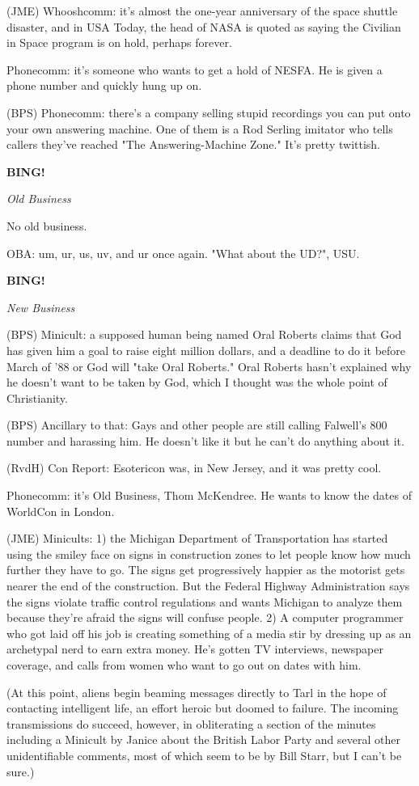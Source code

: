 \documentclass[12pt]{article}
\newcommand{\bing}{{\bf BING!} }
\newcommand{\goto}[1]{\bing \vskip 12pt \centerline{{\em{#1}}}}
\begin{document}
(JME) Whooshcomm: it's almost the one-year anniversary of the space shuttle disaster, and in USA Today, the head of NASA is quoted as saying the Civilian in Space program is on hold, perhaps forever.

Phonecomm: it's someone who wants to get a hold of NESFA. He is given a phone number and quickly hung up on.

(BPS) Phonecomm: there's a company selling stupid recordings you can put onto your own answering machine. One of them is a Rod Serling imitator who tells callers they've reached "The Answering-Machine Zone." It's pretty twittish.

\goto{Old Business}

No old business.

OBA: um, ur, us, uv, and ur once again. "What about the UD?", USU.

\goto{New Business}

(BPS) Minicult: a supposed human being named Oral Roberts claims that God has given him a goal to raise eight million dollars, and a deadline to do it before March of '88 or God will "take Oral Roberts." Oral Roberts hasn't explained why he doesn't want to be taken by God, which I thought was the whole point of Christianity.

(BPS) Ancillary to that: Gays and other people are still calling Falwell's 800 number and harassing him. He doesn't like it but he can't do anything about it.

(RvdH) Con Report: Esotericon was, in New Jersey, and it was pretty cool.

Phonecomm: it's Old Business, Thom McKendree. He wants to know the dates of WorldCon in London.

(JME) Minicults: 1) the Michigan Department of Transportation has started using the smiley face on signs in construction zones to let people know how much further they have to go. The signs get progressively happier as the motorist gets nearer the end of the construction. But the Federal Highway Administration says the signs violate traffic control regulations and wants Michigan to analyze them because they're afraid the signs will confuse people. 2) A computer programmer who got laid off his job is creating something of a media stir by dressing up as an archetypal nerd to earn extra money. He's gotten TV interviews, newspaper coverage, and calls from women who want to go out on dates with him.

(At this point, aliens begin beaming messages directly to Tarl in the hope of contacting intelligent life, an effort heroic but doomed to failure. The incoming transmissions do succeed, however, in obliterating a section of the minutes including a Minicult by Janice about the British Labor Party and several other unidentifiable comments, most of which seem to be by Bill Starr, but I can't be sure.)
\end{document}
